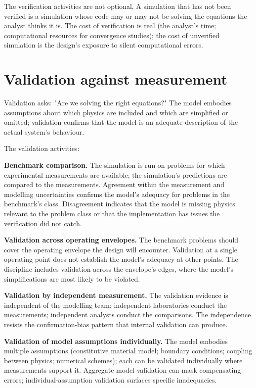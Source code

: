 The verification activities are not optional. A simulation that has not been verified is a simulation whose code may or may not be solving the equations the analyst thinks it is. The cost of verification is real (the analyst's time; computational resources for convergence studies); the cost of unverified simulation is the design's exposure to silent computational errors.

\section{Validation against measurement}

Validation asks: "Are we solving the right equations?" The model embodies assumptions about which physics are included and which are simplified or omitted; validation confirms that the model is an adequate description of the actual system's behaviour.

The validation activities:

\textbf{Benchmark comparison.} The simulation is run on problems for which experimental measurements are available; the simulation's predictions are compared to the measurements. Agreement within the measurement and modelling uncertainties confirms the model's adequacy for problems in the benchmark's class. Disagreement indicates that the model is missing physics relevant to the problem class or that the implementation has issues the verification did not catch.

\textbf{Validation across operating envelopes.} The benchmark problems should cover the operating envelope the design will encounter. Validation at a single operating point does not establish the model's adequacy at other points. The discipline includes validation across the envelope's edges, where the model's simplifications are most likely to be violated.

\textbf{Validation by independent measurement.} The validation evidence is independent of the modelling team: independent laboratories conduct the measurements; independent analysts conduct the comparisons. The independence resists the confirmation-bias pattern that internal validation can produce.

\textbf{Validation of model assumptions individually.} The model embodies multiple assumptions (constitutive material model; boundary conditions; coupling between physics; numerical schemes); each can be validated individually where measurements support it. Aggregate model validation can mask compensating errors; individual-assumption validation surfaces specific inadequacies.

